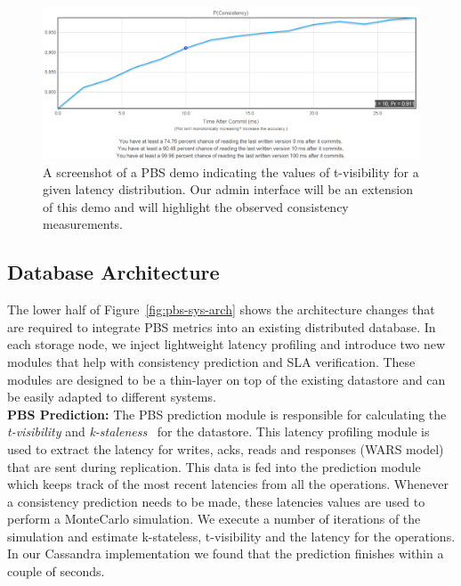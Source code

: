 \begin{figure}[tb]
\centering
\includegraphics[width=.90\textwidth]{figs/pbs-demo-screenshot.pdf}
\caption{A screenshot of a PBS demo indicating the values of t-visibility for a
given latency distribution. Our admin interface will be an extension of this
demo and will highlight the observed consistency measurements.}
\label{fig:pbs-demo-screenshot}
\end{figure}



\subsection{Database Architecture}

The lower half of Figure~\ref{fig:pbs-sys-arch} shows the architecture changes
that are required to integrate PBS metrics into an existing distributed
database. In each storage node, we inject lightweight latency profiling and
introduce two new modules that help with consistency prediction and SLA
verification. These modules are designed to be a thin-layer on top of the
existing datastore and can be easily adapted to different systems.\\

\textbf{PBS Prediction:} The PBS prediction module is responsible for
calculating the \textit{t-visibility} and
\textit{k-staleness}~\cite{pbs-vldb2012} for the
datastore. This latency profiling module is used to extract the latency for
writes, acks, reads and responses (WARS model) that are sent during replication.
This data is fed into the prediction module which keeps track of the most recent
latencies from all the operations.  Whenever a consistency prediction needs to
be made, these latencies values are used to perform a MonteCarlo simulation. We
execute a number of iterations of the simulation and estimate k-stateless,
t-visibility and the latency for the operations. In our Cassandra implementation
we found that the prediction finishes within a couple of seconds. \\ 



